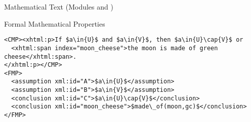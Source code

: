 \begin{tchapter}[id=mtxt,short=Mathematical Text]{Mathematical Text (Modules
   and )}
\begin{tsection}[id=FMP]{Formal Mathematical Properties}
\begin{lstlisting}[mathescape,label=lst:sequent,
  caption={Representing Vernacular as an \element{FMP} Sequent},
  index={trl,xml:lang,CMP,FMP,OMOBJ}]
<CMP><xhtml:p>If $a\in{U}$ and $a\in{V}$, then $a\in{U}\cap{V}$ or 
  <xhtml:span index="moon_cheese">the moon is made of green cheese</xhtml:span>.
</xhtml:p></CMP>
<FMP>
  <assumption xml:id="A">$a\in{U}$</assumption>
  <assumption xml:id="B">$a\in{V}$</assumption>
  <conclusion xml:id="C">$a\in{U}\cap{V}$</conclusion>
  <conclusion xml:id="moon_cheese">$made\_of(moon,gc)$</conclusion>
</FMP>
\end{lstlisting}
\end{tsection}



\end{tchapter}


